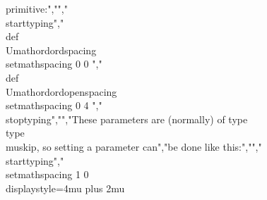 primitive:","","\\starttyping","\\def\\Umathordordspacing     {\\setmathspacing 0 0 }","\\def\\Umathordordopenspacing {\\setmathspacing 0 4 }","\\stoptyping","","These parameters are (normally) of type \\type {\\muskip}, so setting a parameter can","be done like this:","","\\starttyping","\\setmathspacing 1 0 \\displaystyle=4mu plus 2mu %